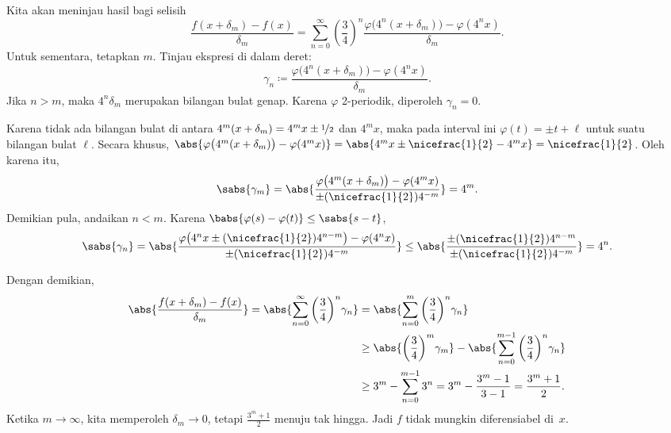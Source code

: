 \begin{example}
Kita akan meninjau hasil bagi selisih
\begin{equation*}
\frac{f(x+\delta_m)-f(x)}{\delta_m}
=
\sum_{n=0}^\infty 
{\left(\frac{3}{4}\right)}^n
\frac{\varphi\bigl(4^n(x+\delta_m)\bigr)-\varphi(4^nx)}{\delta_m} .
\end{equation*}
Untuk sementara, tetapkan $m$.  Tinjau ekspresi di dalam deret:
\begin{equation*}
\gamma_{n} \coloneqq
\frac{\varphi\bigl(4^n(x+\delta_m)\bigr)-\varphi(4^nx)}{\delta_m} .
\end{equation*}
Jika $n > m$, maka $4^n\delta_m$ merupakan bilangan bulat genap.  Karena $\varphi$
2-periodik, diperoleh $\gamma_n = 0$.

Karena tidak ada bilangan bulat di antara 
$4^m(x+\delta_m) = 4^m x\pm\nicefrac{1}{2}$ dan $4^m x$, maka pada interval ini
$\varphi(t) = \pm t + \ell$ untuk suatu bilangan bulat $\ell$.
Secara khusus,
$\abs{\varphi\bigl(4^m(x+ \delta_m)\bigr)-\varphi(4^mx)} =
\abs{4^mx\pm\nicefrac{1}{2}-4^mx} = \nicefrac{1}{2}$.  Oleh karena itu,
\begin{equation*}
\sabs{\gamma_m} =
\abs{
\frac{\varphi\bigl(4^m(x+\delta_m)\bigr)-\varphi(4^mx)}{\pm (\nicefrac{1}{2}) 4^{-m}}
}
= 4^m .
\end{equation*}
Demikian pula, andaikan $n < m$.  Karena $\babs{\varphi(s) -\varphi(t)} \leq
\sabs{s-t}$,
\begin{equation*}
\sabs{\gamma_n} =
\abs{\frac{\varphi\bigl(4^nx\pm(\nicefrac{1}{2})4^{n-m}\bigr)-\varphi(4^nx)}{\pm
(\nicefrac{1}{2}) 4^{-m}}}
\leq
\abs{\frac{\pm(\nicefrac{1}{2})4^{n-m}}{\pm (\nicefrac{1}{2}) 4^{-m}}} = 4^n
.
\end{equation*}

Dengan demikian,
\begin{equation*}
\begin{split}
\abs{
\frac{f(x+\delta_m)-f(x)}{\delta_m}
}
=
\abs{
\sum_{n=0}^\infty 
{\left(\frac{3}{4}\right)}^n
\gamma_n
}
& =
\abs{
\sum_{n=0}^m 
{\left(\frac{3}{4}\right)}^n
\gamma_n
}
\\
& \geq
\abs{
{\left(\frac{3}{4}\right)}^m
\gamma_m}
-
\abs{
\sum_{n=0}^{m-1} 
{\left(\frac{3}{4}\right)}^n
\gamma_n
}
\\
& \geq
3^m
-
\sum_{n=0}^{m-1} 
3^n
=
3^m
-
\frac{3^{m}-1}{3-1}
=
\frac{3^m +1}{2} .
\end{split}
\end{equation*}
Ketika $m \to \infty$, kita memperoleh
$\delta_m \to 0$, tetapi $\frac{3^m+1}{2}$
menuju tak hingga.  Jadi $f$ tidak mungkin diferensiabel di~$x$.
\end{example}

